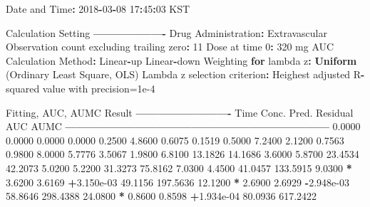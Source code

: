 \documentclass[12pt,]{krantz}
\newenvironment{Shaded}{\begin{snugshade}}{\end{snugshade}}
\newcommand{\KeywordTok}[1]{\textcolor[rgb]{0.13,0.29,0.53}{\textbf{#1}}}
\newcommand{\DecValTok}[1]{\textcolor[rgb]{0.00,0.00,0.81}{#1}}
\newcommand{\FloatTok}[1]{\textcolor[rgb]{0.00,0.00,0.81}{#1}}
\newcommand{\StringTok}[1]{\textcolor[rgb]{0.31,0.60,0.02}{#1}}
\newcommand{\ControlFlowTok}[1]{\textcolor[rgb]{0.13,0.29,0.53}{\textbf{#1}}}
\newcommand{\OperatorTok}[1]{\textcolor[rgb]{0.81,0.36,0.00}{\textbf{#1}}}
\newcommand{\NormalTok}[1]{#1}
\theoremstyle{definition}
\theoremstyle{definition}
\theoremstyle{definition}
\theoremstyle{remark}
\begin{document}
\begin{Shaded}
\begin{Highlighting}[]
{{{{{{{{{{{{\NormalTok{Date and Time}\OperatorTok{:}\StringTok{ }\DecValTok{2018}\OperatorTok{-}\DecValTok{03}\OperatorTok{-}\DecValTok{08} \DecValTok{17}\OperatorTok{:}\DecValTok{45}\OperatorTok{:}\DecValTok{03}\NormalTok{ KST}

\NormalTok{Calculation Setting}
\OperatorTok{-------------------}
\NormalTok{Drug Administration}\OperatorTok{:}\StringTok{ }\NormalTok{Extravascular}
\NormalTok{Observation count excluding trailing zero}\OperatorTok{:}\StringTok{ }\DecValTok{11}
\NormalTok{Dose at time }\DecValTok{0}\OperatorTok{:}\StringTok{ }\DecValTok{320}\NormalTok{ mg}
\NormalTok{AUC Calculation Method}\OperatorTok{:}\StringTok{ }\NormalTok{Linear}\OperatorTok{-}\NormalTok{up Linear}\OperatorTok{-}\NormalTok{down}
\NormalTok{Weighting }\ControlFlowTok{for}\NormalTok{ lambda z}\OperatorTok{:}\StringTok{ }\KeywordTok{Uniform}\NormalTok{ (Ordinary Least Square, OLS)}
\NormalTok{Lambda z selection criterion}\OperatorTok{:}\StringTok{ }\NormalTok{Heighest adjusted R}\OperatorTok{-}\NormalTok{squared value with precision=}\FloatTok{1e-4}


\NormalTok{Fitting, AUC, AUMC Result}
\OperatorTok{-------------------------}
\StringTok{      }\NormalTok{Time         Conc.      Pred.   Residual       AUC       AUMC}
\OperatorTok{---------------------------------------------------------------------}
\StringTok{     }\FloatTok{0.0000}       \FloatTok{0.0000}                           \FloatTok{0.0000}     \FloatTok{0.0000}
     \FloatTok{0.2500}       \FloatTok{4.8600}                           \FloatTok{0.6075}     \FloatTok{0.1519}
     \FloatTok{0.5000}       \FloatTok{7.2400}                           \FloatTok{2.1200}     \FloatTok{0.7563}
     \FloatTok{0.9800}       \FloatTok{8.0000}                           \FloatTok{5.7776}     \FloatTok{3.5067}
     \FloatTok{1.9800}       \FloatTok{6.8100}                          \FloatTok{13.1826}    \FloatTok{14.1686}
     \FloatTok{3.6000}       \FloatTok{5.8700}                          \FloatTok{23.4534}    \FloatTok{42.2073}
     \FloatTok{5.0200}       \FloatTok{5.2200}                          \FloatTok{31.3273}    \FloatTok{75.8162}
     \FloatTok{7.0300}       \FloatTok{4.4500}                          \FloatTok{41.0457}   \FloatTok{133.5915}
     \FloatTok{9.0300} \OperatorTok{*}\StringTok{     }\FloatTok{3.6200}     \FloatTok{3.6169} \OperatorTok{+}\FloatTok{3.150e-03}    \FloatTok{49.1156}   \FloatTok{197.5636}
    \FloatTok{12.1200} \OperatorTok{*}\StringTok{     }\FloatTok{2.6900}     \FloatTok{2.6929} \OperatorTok{-}\FloatTok{2.948e-03}    \FloatTok{58.8646}   \FloatTok{298.4388}
    \FloatTok{24.0800} \OperatorTok{*}\StringTok{     }\FloatTok{0.8600}     \FloatTok{0.8598} \OperatorTok{+}\FloatTok{1.934e-04}    \FloatTok{80.0936}   \FloatTok{617.2422}

}}}}}}}}}}}}
\end{Highlighting}
\end{Shaded}
\end{document}
